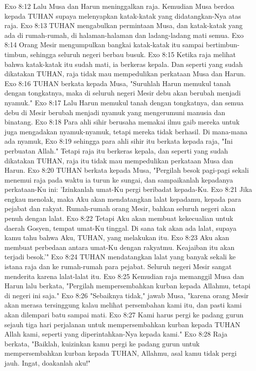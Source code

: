 Exo 8:12  Lalu Musa dan Harun meninggalkan raja. Kemudian Musa berdoa kepada TUHAN supaya melenyapkan katak-katak yang didatangkan-Nya atas raja.
Exo 8:13  TUHAN mengabulkan permintaan Musa, dan katak-katak yang ada di rumah-rumah, di halaman-halaman dan ladang-ladang mati semua.
Exo 8:14  Orang Mesir mengumpulkan bangkai katak-katak itu sampai bertimbun-timbun, sehingga seluruh negeri berbau busuk.
Exo 8:15  Ketika raja melihat bahwa katak-katak itu sudah mati, ia berkeras kepala. Dan seperti yang sudah dikatakan TUHAN, raja tidak mau mempedulikan perkataan Musa dan Harun.
Exo 8:16  TUHAN berkata kepada Musa, "Suruhlah Harun memukul tanah dengan tongkatnya, maka di seluruh negeri Mesir debu akan berubah menjadi nyamuk."
Exo 8:17  Lalu Harun memukul tanah dengan tongkatnya, dan semua debu di Mesir berubah menjadi nyamuk yang mengerumuni manusia dan binatang.
Exo 8:18  Para ahli sihir berusaha memakai ilmu gaib mereka untuk juga mengadakan nyamuk-nyamuk, tetapi mereka tidak berhasil. Di mana-mana ada nyamuk,
Exo 8:19  sehingga para ahli sihir itu berkata kepada raja, "Ini perbuatan Allah." Tetapi raja itu berkeras kepala, dan seperti yang sudah dikatakan TUHAN, raja itu tidak mau mempedulikan perkataan Musa dan Harun.
Exo 8:20  TUHAN berkata kepada Musa, "Pergilah besok pagi-pagi sekali menemui raja pada waktu ia turun ke sungai, dan sampaikanlah kepadanya perkataan-Ku ini: 'Izinkanlah umat-Ku pergi beribadat kepada-Ku.
Exo 8:21  Jika engkau menolak, maka Aku akan mendatangkan lalat kepadamu, kepada para pejabat dan rakyat. Rumah-rumah orang Mesir, bahkan seluruh negeri akan penuh dengan lalat.
Exo 8:22  Tetapi Aku akan membuat kekecualian untuk daerah Gosyen, tempat umat-Ku tinggal. Di sana tak akan ada lalat, supaya kamu tahu bahwa Aku, TUHAN, yang melakukan itu.
Exo 8:23  Aku akan membuat perbedaan antara umat-Ku dengan rakyatmu. Keajaiban itu akan terjadi besok.'"
Exo 8:24  TUHAN mendatangkan lalat yang banyak sekali ke istana raja dan ke rumah-rumah para pejabat. Seluruh negeri Mesir sangat menderita karena lalat-lalat itu.
Exo 8:25  Kemudian raja memanggil Musa dan Harun lalu berkata, "Pergilah mempersembahkan kurban kepada Allahmu, tetapi di negeri ini saja."
Exo 8:26  "Sebaiknya tidak," jawab Musa, "karena orang Mesir akan merasa tersinggung kalau melihat persembahan kami itu, dan pasti kami akan dilempari batu sampai mati.
Exo 8:27  Kami harus pergi ke padang gurun sejauh tiga hari perjalanan untuk mempersembahkan kurban kepada TUHAN Allah kami, seperti yang diperintahkan-Nya kepada kami."
Exo 8:28  Raja berkata, "Baiklah, kuizinkan kamu pergi ke padang gurun untuk mempersembahkan kurban kepada TUHAN, Allahmu, asal kamu tidak pergi jauh. Ingat, doakanlah aku!"
